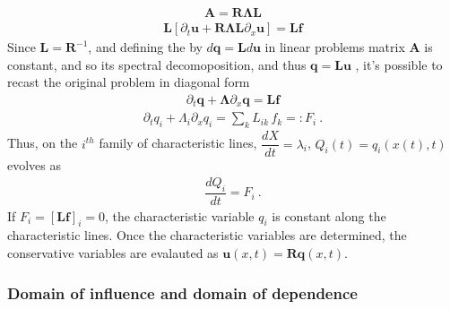 \documentclass[letterpaper,10pt,english]{jupyterBook}
\begin{document}
\sphinxAtStartPar
{}
\begin{equation*}
\begin{split}\mathbf{A} = \mathbf{R} \symbf{\Lambda} \mathbf{L}\end{split}
\end{equation*}\begin{equation*}
\begin{split}\mathbf{L} \left[ \partial_t \mathbf{u} + \mathbf{R} \symbf{\Lambda} \mathbf{L} \partial_x \mathbf{u} \right] = \mathbf{L} \mathbf{f} \end{split}
\end{equation*}
\sphinxAtStartPar
Since \(\mathbf{L} = \mathbf{R}^{-1}\), and defining the  by \(d \mathbf{q} = \mathbf{L} d \mathbf{u}\) \sphinxhyphen{} in linear problems matrix \(\mathbf{A}\) is constant, and so its spectral decomoposition, and thus \(\mathbf{q} = \mathbf{L} \mathbf{u}\) \sphinxhyphen{} , it’s possible to recast the original problem in diagonal form
\begin{equation*}
\begin{split}\partial_t \mathbf{q} + \symbf{\Lambda} \partial_x \mathbf{q} = \mathbf{L} \mathbf{f}\end{split}
\end{equation*}\begin{equation*}
\begin{split}\partial_t q_i + \Lambda_i \partial_x q_i = \sum_{k} L_{ik} \, f_k =: F_i \ .\end{split}
\end{equation*}
\sphinxAtStartPar
Thus, on the \(i^{th}\) family of characteristic lines, \(\dfrac{d X}{dt} = \lambda_i\), \(Q_i(t) = q_i(x(t), t)\) evolves as
\begin{equation*}
\begin{split}\dfrac{d Q_i}{d t} = F_i \ .\end{split}
\end{equation*}
\sphinxAtStartPar
If \(F_i = \left[ \mathbf{L} \mathbf{f} \right]_i = 0\), the characteristic variable \(q_i\) is constant along the characteristic lines. Once the characteristic variables are determined, the conservative variables are evalauted as \(\mathbf{u}(x,t) = \mathbf{R} \mathbf{q}(x,t)\).


\subsubsection{Domain of influence and domain of dependence}
\label{\detokenize{ch/pde/hyperbolic:domain-of-influence-and-domain-of-dependence}}
\end{document}
